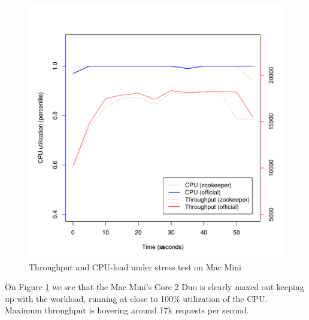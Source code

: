 \clearpage
\begin{figure}[h]
    \centering
    \includegraphics[width=1.0\textwidth]{results/throughput/singlenode/throughput_macmini}
    \caption{Throughput and CPU-load under stress test on Mac Mini}
    \label{fig:thug_mini}
\end{figure}

On Figure \ref{fig:thug_mini} we see that the Mac Mini's Core 2 Duo is clearly maxed out keeping up with the workload, running at close to 100\% utilization of the CPU. Maximum throughput is hovering around 17k requests per second. 

